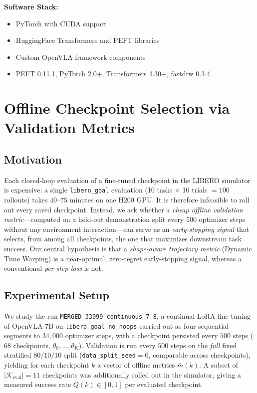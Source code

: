\textbf{Software Stack:}
\begin{itemize}
    \item PyTorch with CUDA support
    \item HuggingFace Transformers and PEFT libraries
    \item Custom OpenVLA framework components
    \item PEFT 0.11.1, PyTorch 2.0+, Transformers 4.30+, fastdtw 0.3.4
\end{itemize}

\section{Offline Checkpoint Selection via Validation Metrics}
\label{sec:ckpt-selection}

\subsection{Motivation}

Each closed-loop evaluation of a fine-tuned checkpoint in the LIBERO simulator is
expensive: a single \texttt{libero\_goal} evaluation (10 tasks $\times$ 10 trials
$= 100$ rollouts) takes $40$--$75$ minutes on one H200 GPU. It is therefore
infeasible to roll out every saved checkpoint. Instead, we ask whether a
\emph{cheap offline validation metric}---computed on a held-out demonstration
split every $500$ optimizer steps without any environment interaction---can serve
as an \emph{early-stopping signal} that selects, from among all checkpoints, the
one that maximizes downstream task success. Our central hypothesis is that a
\emph{shape-aware trajectory metric} (Dynamic Time Warping) is a near-optimal,
zero-regret early-stopping signal, whereas a conventional \emph{per-step loss}
is not.

\subsection{Experimental Setup}

We study the run \texttt{MERGED\_33999\_continuous\_7\_8}, a continual LoRA
fine-tuning of OpenVLA-7B on \texttt{libero\_goal\_no\_noops} carried out as four
sequential segments to $34{,}000$ optimizer steps, with a checkpoint persisted
every $500$ steps ($68$ checkpoints, $\theta_0,\dots,\theta_K$). Validation is run
every $500$ steps on the \emph{full} fixed stratified $80/10/10$ split
(\texttt{data\_split\_seed}$=0$, comparable across checkpoints), yielding for each
checkpoint $k$ a vector of offline metrics $\bar m(k)$. A subset of
$|\mathcal{K}_{\mathrm{eval}}| = 11$ checkpoints was additionally rolled out in the
simulator, giving a measured success rate $Q(k)\in[0,1]$ per evaluated checkpoint.

